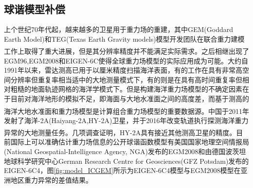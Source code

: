 \documentclass[12pt,a4,utf8]{article}
\newcommand{\upcite}[1]{\textsuperscript{\textsuperscript{\cite{#1}}}} %
\begin{document}
\subsection{球谐模型补偿}
上个世纪70年代起，越来越多的卫星用于重力场的重建，其中GEM(Goddard Earth Model)和TEG(Texas Earth Gravity models)模型开发团队在联合重力建模工作上取得了重大进展\upcite{lerch1972gravitational,tapley1997teg}，但是其分辨率精度并不能满足实际需求。之后相继出现了EGM96,EGM2008和EIGEN-6C使得全球重力场模型的实际应用成为可能。大约自1991年以来，雷达测高已用于以厘米精度扫描海洋表面，有的工作在具有非常高空间分辨率但重复率相当适中的大地测量模式下，有的则是在具有高时间重复率但相对粗糙的地面轨迹网格的海洋学模式下。但是构建海洋重力场模型的不确定因素在于目前对海洋地形的模拟不足，即海面与大地水准面之间的高度差，而基于测高的海洋大地水准面和重力场模型是计算组合重力场模型的重要数据源\upcite{pavlis2012development,flechtner2021satellite}。中国于2011年发射了海洋-2A(Haiyang-2A,HY-2A)卫星，并于2016年改变轨道执行探测海洋重力异常的大地测量任务。几项调查证明\upcite{jiang2019measurement,liu2020preliminary,wan2020vertical,zhang2020inversion,zhu2019hy,ji2021deflections,guo2022accuracy,guo2022accuracy}，HY-2A具有接近其他测高卫星的精度。目前国际上可以准确估计重力场信息的公开球谐函数模型有美国国家地理空间情报局(National Geospatial-Intelligence Agency, NGA)发布的EGM2008和由德国波茨坦地球科学研究中心German Research Centre for Geosciences(GFZ Potsdam)发布的EIGEN-6C4，图\ref{fig:model_ICGEM}所示为EIGEN-6C4模型与EGM2008模型在亚洲地区重力异常的差值结果。
\end{document}
